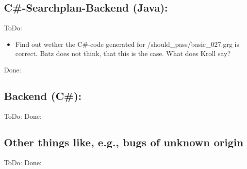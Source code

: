 \documentclass[12pt,a4paper]{article}
\begin{document}
\subsection*{C\#-Searchplan-Backend (Java):}
ToDo:
\begin{itemize}
	\item Find out wether the C\#-code generated for {/should\_pass/basic\_027.grg} is correct. Batz does not think, that this is the case. What does Kroll say?
\end{itemize}
Done:



\subsection*{Backend (C\#):}
ToDo:
Done:



\subsection*{Other things like, e.g., bugs of unknown origin}
ToDo:
Done:
\end{document}
